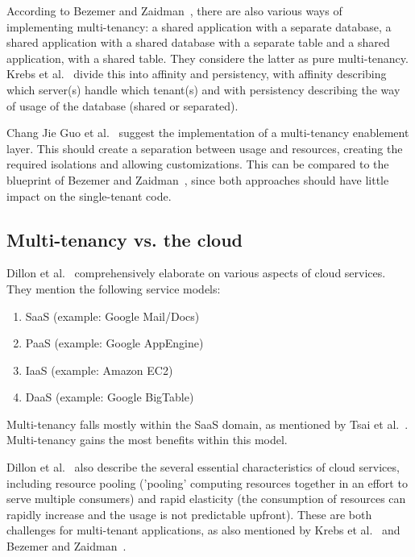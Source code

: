 According to Bezemer and Zaidman~\cite{bezemer2010multi}, there are also various ways of implementing multi-tenancy: a shared application with a separate database, a shared application with a shared database with a separate table and a shared application, with a shared table. They considere the latter as pure multi-tenancy. Krebs et al.~\cite{krebs2012architecture} divide this into affinity and persistency, with affinity describing which server(s) handle which tenant(s) and with persistency describing the way of usage of the database (shared or separated).

Chang Jie Guo et al.~\cite{guo2007framework} suggest the implementation of a multi-tenancy enablement layer. This should create a separation between usage and resources, creating the required isolations and allowing customizations. This can be compared to the blueprint of Bezemer and Zaidman~\cite{bezemer2010multi}, since both approaches should have little impact on the single-tenant code.

\subsection{Multi-tenancy vs. the cloud}

Dillon et al.~\cite{dillon2010cloud} comprehensively elaborate on various aspects of cloud services. They mention the following service models: 
\begin{enumerate}
\item \ac{SaaS} (example: Google Mail/Docs)
\item \ac{PaaS} (example: Google AppEngine)
\item \ac{IaaS} (example: Amazon EC2)
\item \ac{DaaS} (example: Google BigTable)
\end{enumerate}

Multi-tenancy falls mostly within the \ac{SaaS} domain, as mentioned by Tsai et al.~\cite{tsai2010towards}. Multi-tenancy gains the most benefits within this model.

Dillon et al.~\cite{dillon2010cloud} also describe the several essential characteristics of cloud services, including resource pooling ('pooling' computing resources together in an effort to serve multiple consumers) and rapid elasticity (the consumption of resources can rapidly increase and the usage is not predictable upfront). These are both challenges for multi-tenant applications, as also mentioned by Krebs et al.~\cite{krebs2012architecture} and Bezemer and Zaidman~\cite{bezemer2010multi}.

